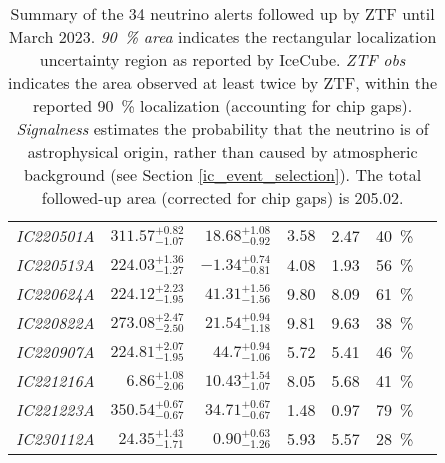 \begin{table*}
\begin{tabular}{l r r r r c c}
        \emph{IC220501A} & $311.57^{+0.82}_{-1.07}$ & $18.68^{+1.08}_{-0.92}$ & $3.58$ & 2.47 & \SI{40}{\percent}&\cite{IC220501A1, IC220501A2}\\
        \emph{IC220513A} & $224.03^{+1.36}_{-1.27}$ & $-1.34^{+0.74}_{-0.81}$ & 4.08 & 1.93 & \SI{56}{\percent}&\cite{IC220513A1, IC220513A2}\\
        \emph{IC220624A} & $224.12^{+2.23}_{-1.95}$ & $41.31^{+1.56}_{-1.56}$ & 9.80 & 8.09 & \SI{61}{\percent}&\cite{IC220624A1, IC220624A2}\\
        \emph{IC220822A} & $273.08^{+2.47}_{-2.50}$ & $21.54^{+0.94}_{-1.18}$ & 9.81 & 9.63 & \SI{38}{\percent}&\cite{IC220822A1, IC220822A2}\\
        \emph{IC220907A} & $224.81^{+2.07}_{-1.95}$ & $44.7^{+0.94}_{-1.06}$ & 5.72 & 5.41 & \SI{46}{\percent}&\cite{IC220907A1, IC220907A2, IC220907A3}\\
        \emph{IC221216A} & $6.86^{+1.08}_{-2.06}$ & $10.43^{+1.54}_{-1.07}$ & 8.05 & 5.68 & \SI{41}{\percent}&\cite{IC221216A1, IC221216A2}\\
        \emph{IC221223A} & $350.54^{+0.67}_{-0.67}$ & $34.71^{+0.67}_{-0.67}$ & 1.48 & 0.97 & \SI{79}{\percent}&\cite{IC221223A1, IC221223A2}\\
        \emph{IC230112A} & $24.35^{+1.43}_{-1.71}$ & $0.90^{+0.63}_{-1.26}$ & 5.93 & 5.57 & \SI{28}{\percent}&\cite{IC230112A1, IC230112A2}\\
        \hline
    \end{tabular}
    \caption[Summary of the 34 neutrino alerts followed up by ZTF]{Summary of the 34 neutrino alerts followed up by ZTF until March 2023. \textit{\SI{90}{\percent} area} indicates the rectangular localization uncertainty region as reported by IceCube. \textit{ZTF obs} indicates the area observed at least twice by ZTF, within the reported \SI{90}{\percent} localization (accounting for chip gaps). \textit{Signalness} estimates the probability that the neutrino is of astrophysical origin, rather than caused by atmospheric background (see Section \ref{ic_event_selection}). The total followed-up area (corrected for chip gaps) is \SI{205.02}{\square\deg}.}
    \label{tab:neutrino_alert_overview}
\end{table*}

